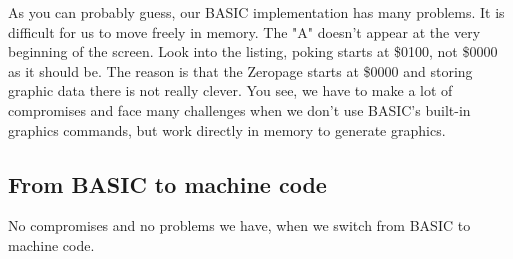 As you can probably guess, our BASIC implementation has many problems. It is difficult for us to move freely in memory. The "A" doesn't appear 
at the very beginning of the screen. Look into the listing, poking starts at \$0100, not \$0000 as it should be. The reason is that the Zeropage starts at \$0000
and storing graphic data there is not really clever. You see, we have to make a lot of compromises and face many challenges when we don't use BASIC's built-in graphics commands,
but work directly in memory to generate graphics. 

\subsection*{From BASIC to machine code}

No compromises and no problems we have, when we switch from BASIC to machine code.
